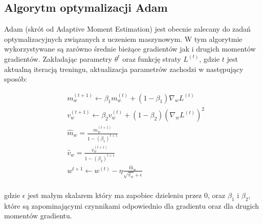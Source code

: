 \newpage
\subsection{Algorytm optymalizacji Adam}
Adam (skrót od Adaptive Moment Estimation) jest obecnie zalecany do zadań optymalizacyjnych związanych z uczeniem maszynowym.
W tym algorytmie wykorzystywane są zarówno średnie bieżące gradientów jak i drugich momentów gradientów.
Zakładając parametry $\theta^{t}$ oraz funkcję straty $L^{(t)}$, gdzie $t$ jest aktualną iteracją treningu, 
aktualizacja parametrów zachodzi w następujący sposób:

\begin{align*}
  &m_w^{(t+1)} \leftarrow \beta_{1}m_w^{(t)} + (1 - \beta_1)\nabla_wL^{(t)} \\
  &v_w^{(t+1)} \leftarrow \beta_{2}v_w^{(t)} + (1 - \beta_2)(\nabla_wL^{(t)})^2 \\
  &\hat m_w = \frac{m_w^{(t+1)}}{1 - (\beta_1)^{t+1}} \\
  &\hat v_w = \frac{v_w^{(t+1)}}{1 - (\beta_2)^{t+1}} \\
  &w^{t+1} \leftarrow w^{(t)} -  \eta \frac{\hat m_w}{\sqrt{\hat v_w} + \epsilon} \\
\end{align*}

gdzie $\epsilon$ jest małym skalarem który ma zapobiec dzieleniu przez $0$, 
oraz $\beta _{1}$ i $\beta_{2}$, które są zapominającymi czynnikami odpowiednio dla gradientu oraz dla 
drugich momentów gradientu.
